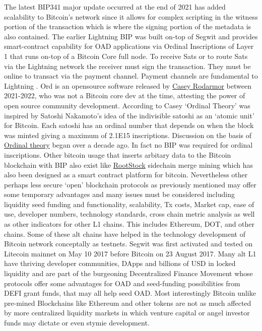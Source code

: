 \documentclass[final,5p,times,twocolumn,authoryear]{elsarticle}
\begin{document}
The latest BIP341 major update occurred at the end of 2021 has added scalability to Bitcoin's network since it allows for complex scripting in the witness portion of the transaction which is where the signing portion of the metadata is also contained. The earlier Lightning BIP was built on-top of Segwit and provides smart-contract capability for OAD applications via Ordinal Inscriptions of Layer 1 that runs on-top of a Bitcoin Core full node. To receive Sats or to route Sats via the Lightning network the receiver must sign the transaction. They must be online to transact via the payment channel. Payment channels are fundamental to Lightning .  Ord is an opensource software released by \href{https://github.com/casey/ord}{Casey Rodarmor} between 2021-2022, who was not a Bitcoin core dev at the time, attesting the power of open source community development. According to Casey `Ordinal Theory' was inspired by Satoshi Nakamoto's idea of the indivisible satoshi as an `atomic unit' for Bitcoin. Each satoshi has an ordinal number that depends on when the block was minted giving a maximum of 2.1E15 inscriptions. Discussion on the basis of \href{https://bitcointalk.org/index.php?topic=117224.0}{Ordinal theory} began over a decade ago. In fact no BIP was required for ordinal inscriptions. Other bitcoin usage that inserts arbitary data to the Bitcoin blockchain with BIP also exist like \href{https://dev.rootstock.io/rsk/}{RootStock} sidechain merge mining which has also been designed as a smart contract platform for bitcoin. Nevertheless other perhaps less secure `open' blockchain protocols as previously mentioned may offer some temporary advantages and many issues must be considered including liquidity seed funding and functionality, scalability, Tx costs, Market cap, ease of use, developer numbers, technology standards, cross chain metric analysis as well as other indicators for other L1 chains. This includes Ethereum, DOT, and other chains. Some of these alt chains have helped in the technology development of Bitcoin network conceptally as testnets. Segwit was first activated and tested on Litecoin mainnet on May 10 2017 before Bitcoin on 23 August 2017. Many alt L1 have thriving developer communities, DApps and billions of USD in locked liquidity and are part of the burgeoning Decentralized Finance Movement whose protocols offer some advantages for OAD and seed-funding possibilities from DEFI grant funds, that may all help seed OAD. Most interestingly Bitcoin unlike pre-mined Blockchains like Ethereum and other tokens are not as much affected by more centralized liquidity markets in which venture capital or angel investor funds may dictate or even stymie development. 
\end{document}
